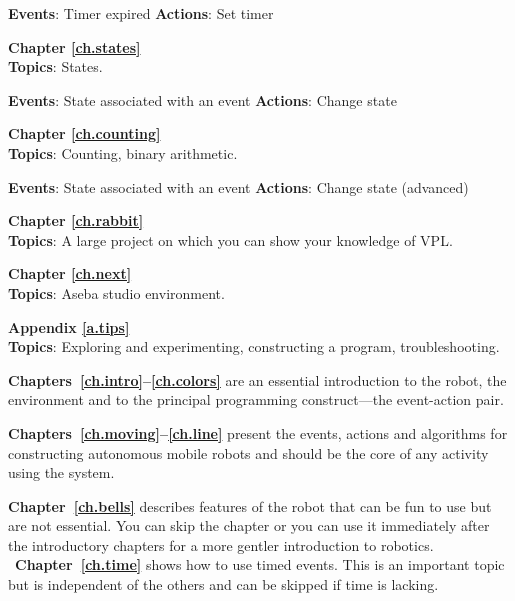 \textbf{Events}: Timer expired \hfill \textbf{Actions}: Set timer

 \hfill {}

\bigskip

{\centering \textbf{Chapter \ref{ch.states}}\\}
\textbf{Topics}: States.

\textbf{Events}: State associated with an event \hfill \textbf{Actions}: Change state

 \hfill {}

\bigskip

{\centering \textbf{Chapter \ref{ch.counting}}\\}
\textbf{Topics}: Counting, binary arithmetic.

\textbf{Events}: State associated with an event  \hfill \textbf{Actions}: Change state (advanced)

 \hfill {}

\bigskip

{\centering \textbf{Chapter \ref{ch.rabbit}}\\}
\textbf{Topics}: A large project on which you can show your knowledge of
VPL.

\bigskip

{\centering \textbf{Chapter \ref{ch.next}}\\}
\textbf{Topics}: Aseba studio environment.

\bigskip

{\centering \textbf{Appendix \ref{a.tips}}\\}
\textbf{Topics}: Exploring and experimenting,
constructing a program, troubleshooting.



\textbf{Chapters~\ref{ch.intro}--\ref{ch.colors}} are an essential introduction
to the robot, the environment and to the principal programming construct---the
event-action pair.

\textbf{Chapters~\ref{ch.moving}--\ref{ch.line}} present the events, actions and algorithms
for constructing autonomous mobile robots and should be the core of any
activity using the system.

\textbf{Chapter~\ref{ch.bells}} describes features of the robot that can
be fun to use but are not essential. You can skip the chapter or you can 
use it immediately after the introductory chapters
for a more gentler introduction to robotics.
\
\textbf{Chapter~\ref{ch.time}} shows how to use timed events.
This is an important topic but is independent of the others
and can be skipped if time is lacking.

